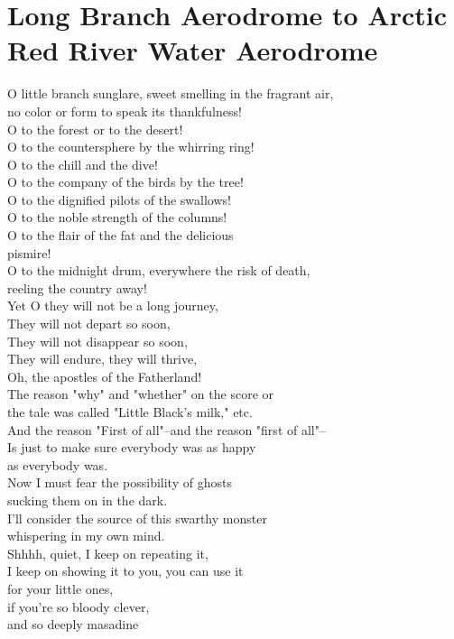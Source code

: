 \documentclass[smalldemyvopaper,11pt,twoside,onecolumn,openright,extrafontsizes]{memoir}
\begin{document}
\chapter{Long Branch Aerodrome to Arctic Red River Water Aerodrome}
O little branch sunglare, sweet smelling in the fragrant air,
\\no color or form to speak its thankfulness!
\\O to the forest or to the desert!
\\O to the countersphere by the whirring ring!
\\O to the chill and the dive!
\\O to the company of the birds by the tree!
\\O to the dignified pilots of the swallows!
\\O to the noble strength of the columns!
\\O to the flair of the fat and the delicious
\\pismire!
\\O to the midnight drum, everywhere the risk of death,
\\reeling the country away!
\\Yet O they will not be a long journey,
\\They will not depart so soon,
\\They will not disappear so soon,
\\They will endure, they will thrive,
\\Oh, the apostles of the Fatherland!
\\The reason "why" and "whether" on the score or
\\the tale was called "Little Black's milk," etc.
\\And the reason "First of all"--and the reason "first of all"--
\\Is just to make sure everybody was as happy
\\as everybody was.
\\Now I must fear the possibility of ghosts
\\sucking them on in the dark.
\\I'll consider the source of this swarthy monster
\\whispering in my own mind.
\\Shhhh, quiet, I keep on repeating it,
\\I keep on showing it to you, you can use it
\\for your little ones,
\\if you're so bloody clever,
\\and so deeply masadine
\end{document}
